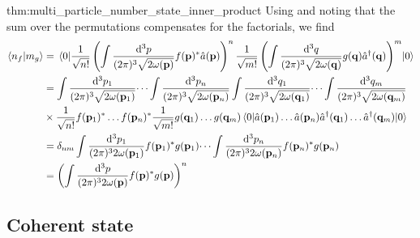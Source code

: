 \begin{delayedproof}{thm:multi_particle_number_state_inner_product}
	Using  and noting that the sum over the permutations compensates for the factorials, we find
	\begin{equation*}
		\begin{split}
			\braket{n_f}{m_g}
			&=
			\expval{
				\frac{1}{\sqrt{n!}}
				\left(
					\int\frac{\dd[3]{p}}{(2\pi)^3\sqrt{2\omega(\vb{p})}}
					f(\vb{p})^*
					\hat{a}(\vb{p})
				\right)^n
				\frac{1}{\sqrt{m!}}
				\left(
					\int\frac{\dd[3]{q}}{(2\pi)^3\sqrt{2\omega(\vb{q})}}
					g(\vb{q})
					\hat{a}^\dagger(\vb{q})
				\right)^m
			}{0}
			\\
			&=
			\int\frac{\dd[3]{p_1}}{(2\pi)^3\sqrt{2\omega(\vb{p}_1)}}
			\dots
			\int\frac{\dd[3]{p_n}}{(2\pi)^3\sqrt{2\omega(\vb{p}_n)}}
			\int\frac{\dd[3]{q_1}}{(2\pi)^3\sqrt{2\omega(\vb{q}_1)}}
			\dots
			\int\frac{\dd[3]{q_m}}{(2\pi)^3\sqrt{2\omega(\vb{q}_m)}}
			\\
			&\times
			\frac{1}{\sqrt{n!}}
			f(\vb{p}_1)^*
			\dots
			f(\vb{p}_n)^*
			\frac{1}{\sqrt{m!}}
			g(\vb{q}_1)
			\dots
			g(\vb{q}_m)
			\expval{
				\hat{a}(\vb{p}_1)
				\dots
				\hat{a}(\vb{p}_n)
				\hat{a}^\dagger(\vb{q}_1)
				\dots
				\hat{a}^\dagger(\vb{q}_m)
			}{0}
			\\
			&=
			\delta_{nm}
			\int\frac{\dd[3]{p_1}}{(2\pi)^32\omega(\vb{p}_1)}
			f(\vb{p}_1)^*
			g(\vb{p}_1)
			\dots
			\int\frac{\dd[3]{p_n}}{(2\pi)^32\omega(\vb{p}_n)}
			f(\vb{p}_n)^*
			g(\vb{p}_n)
			\\
			&=
			\left(
				\int\frac{\dd[3]{p}}{(2\pi)^32\omega(\vb{p})}
				f(\vb{p})^*
				g(\vb{p})
			\right)^n
		\end{split}
	\end{equation*}
\end{delayedproof}

\subsection{Coherent state}

